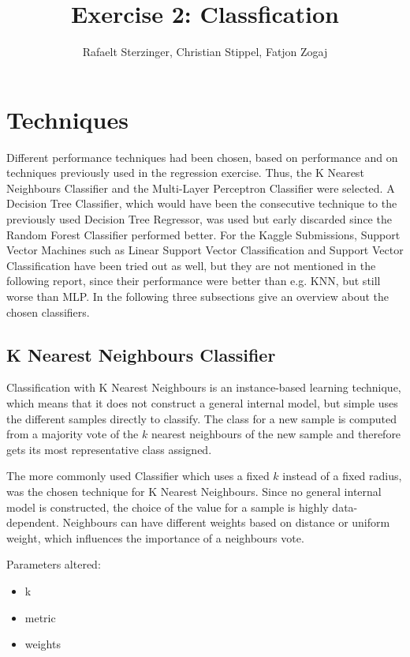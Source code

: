 \documentclass{article}
\title{Exercise 2: Classfication}
\author{Rafaelt Sterzinger, Christian Stippel, Fatjon Zogaj}
\begin{document}
\maketitle

\section{Techniques}
Different performance techniques had been chosen, based on performance and on techniques previously used in the regression exercise. Thus, the K Nearest Neighbours Classifier and the Multi-Layer Perceptron Classifier were selected. A Decision Tree Classifier, which would have been the consecutive technique to the previously used Decision Tree Regressor, was used but early discarded since the Random Forest Classifier performed better. For the Kaggle Submissions, Support Vector Machines such as Linear Support Vector Classification and Support Vector Classification have been tried out as well, but they are not mentioned in the following report, since their performance were better than e.g. KNN, but still worse than MLP. In the following three subsections give an overview about the chosen classifiers.

\subsection{K Nearest Neighbours Classifier}
Classification with K Nearest Neighbours is an instance-based learning technique, which means that it does not construct a general internal model, but simple uses the different samples directly to classify. The class for a new sample is computed from a majority vote of the $k$ nearest neighbours of the new sample and therefore gets its most representative class assigned.

The more commonly used Classifier which uses a fixed $k$ instead of a fixed radius, was the chosen technique for K Nearest Neighbours. Since no general internal model is constructed, the choice of the value for a sample is highly data-dependent. Neighbours can have different weights based on distance or uniform weight, which influences the importance of a neighbours vote. 

Parameters altered:
\begin{itemize}
\item k
\item metric
\item weights
\end{itemize}
\end{document}
